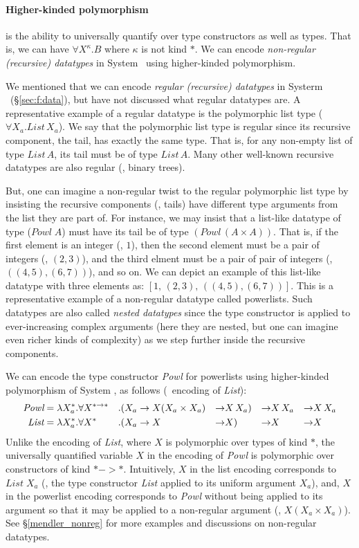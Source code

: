 \paragraph{Higher-kinded polymorphism}\!\!\! is the ability
to universally quantify over type constructors as well as types.
That is, we can have $\forall X^\kappa.B$ where $\kappa$ is not kind $*$.
We can encode \emph{non-regular (recursive) datatypes} in System \Fw\ using
higher-kinded polymorphism.

We mentioned that we can encode \emph{regular (recursive) datatypes}
in Systerm \F\ (\S\ref{sec:f:data}), but have not discussed
what regular datatypes are. A representative example of a regular datatype
is the polymorphic list type ($\forall X_a.\textit{List}\,X_a$).
We say that the polymorphic list type is regular since its recursive
component, the tail, has exactly the same type. That is, for any
non-empty list of type $\textit{List}\,A$, its tail must be of type $\textit{List}\,A$.
Many other well-known recursive datatypes are also regular (\eg, binary trees).

But, one can imagine a non-regular twist to the regular polymorphic list type
by insisting the recursive components (\ie, tails) have different
type arguments from the list they are part of. For instance, we may insist
that a list-like datatype of type ($\textit{Powl}\;A$) must have its tail be
of type $(\textit{Powl}\,(A\times A))$. That is, if the first element is
an integer (\eg, $1$), then the second element must be a pair of integers
(\eg, $(2,3)$), and the third elment must be a pair of pair of integers
(\eg, $((4,5),(6,7))$), and so on. We can depict an example of this list-like
datatype with three elements as: $[1,\,(2,3),\,((4,5),(6,7))]$.
This is a representative example of a non-regular datatype called powerlists.
Such datatypes are also called \emph{nested datatypes} %
since the type constructor is applied to ever-increasing complex arguments
(here they are nested, but one can imagine even richer kinds of complexity)
as we step further inside the recursive components.

We can encode the type constructor \textit{Powl} for powerlists using
higher-kinded polymorphism of System \Fw, as follows
(\cf\ encoding of \textit{List}):
\begin{align*}
\textit{Powl} &= \lambda X_a^{*}.\forall X^{* -> *}&.&
        (X_a -> X(X_a\times X_a) & -> & X\,X_a) & -> & X\,X_a & -> & X\,X_a \\
\textit{List} &= \lambda X_a^{*}.\forall X^{*}&.&
        (X_a -> X & -> & X) & -> & X & -> & X
\end{align*}
Unlike the encoding of \textit{List}, where $X$ is polymorphic over types
of kind $*$, the universally quantified variable $X$ in the encoding of
\textit{Powl} is polymorphic over constructors of kind $* -> *$.
Intuitively, $X$ in the list encoding corresponds to $\textit{List}\;X_a$
(\ie, the type constructor \textit{List} applied to its uniform argument $X_a$),
and, $X$ in the powerlist encoding corresponds to \textit{Powl} without
being applied to its argument so that it may be applied to a non-regular
argument (\eg, $X(X_a\times X_a)$). See \S\ref{mendler_nonreg} for more
examples and discussions on non-regular datatypes.

